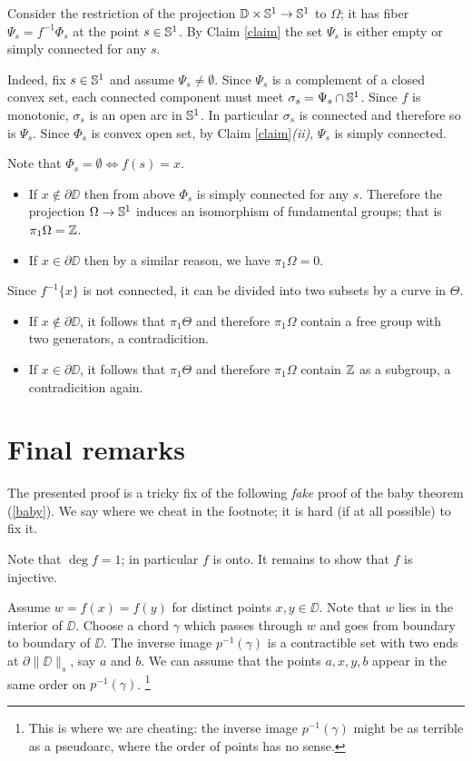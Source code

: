 \documentclass{article}
\begin{document}
Consider the restriction of the projection $\mathbb{D}\times\mathbb{S}^1\to \mathbb{S}^1$ to $\Omega$;
it has fiber $\Psi_s=f^{-1}\Phi_s$ at the point $s\in\mathbb{S}^1$.
By Claim \ref{claim} the set $\Psi_s$ is either empty or simply connected for any $s$.

Indeed, fix $s\in\mathbb{S}^1$ and assume $\Psi_s\ne \emptyset$.
Since $\Psi_s$ is a complement of a closed convex set,
each connected component must meet $\sigma_s=\Psi_s\cap\mathbb{S}^1$.
Since $f$ is monotonic, $\sigma_s$ is an open arc in $\mathbb{S}^1$.
In particular $\sigma_s$ is connected and therefore so is $\Psi_s$.
Since $\Phi_s$ is convex open set, by Claim \ref{claim}\textit{(ii)}, $\Psi_s$ is simply connected.

Note that $\Phi_s=\emptyset\iff f(s)=x$.
\begin{itemize}
\item If $x\notin\partial\DD$ then from above $\Phi_s$ is simply connected for any $s$.
Therefore the projection $\Omega\to \mathbb{S}^1$ induces an isomorphism of fundamental groups; that is $\pi_1\Omega=\mathbb{Z}$.
\item If $x\in\partial\DD$ then by a similar reason, we have $\pi_1\Omega=0$.
\end{itemize}



Since $f^{-1}\{x\}$ is not connected, it can be divided into two subsets by a curve in $\Theta$.
\begin{itemize}
\item If $x\notin\partial \DD$, it follows that $\pi_1\Theta$ and therefore $\pi_1\Omega$ contain a free group with two generators, a contradicition.
\item If $x\in\partial\DD$, it follows that $\pi_1\Theta$ and therefore $\pi_1\Omega$ contain $\mathbb{Z}$ as a subgroup, a contradicition again.\qeds
\end{itemize}


\section{Final remarks}

The presented proof is a tricky fix of the following \emph{fake} proof of the baby theorem (\ref{baby}).
We say where we cheat in the footnote; 
it is hard (if at all possible) to fix it.

Note that  $\deg f=1$;
in particular $f$ is onto.
It remains to show that $f$ is injective.

Assume  $w=f(x)=f(y)$ for distinct points $x,y\in\DD$.
Note that  $w$ lies in the interior of $\DD$.
Choose a chord $\gamma$ which passes through $w$ and goes 
from boundary to boundary of $\DD$.
The inverse image $p^{-1}(\gamma)$ is a contractible set with two ends at $\partial\|\DD\|_s$, say $a$ and $b$.
We can assume that the points $a,x,y,b$ appear in the same order on $p^{-1}(\gamma)$.
\footnote{This is where we are cheating: the inverse image $p^{-1}(\gamma)$ might be as terrible as a pseudoarc, 
where the order of points has no sense.}
\end{document}
